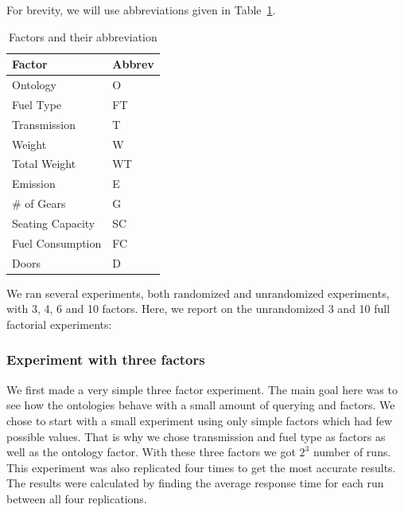 \documentclass{llncs}
\begin{document}
For brevity, we will use abbreviations given in Table~\ref{facandabbrev}.

\begin{table}
    \begin{tabular}{ | l | l |}
    \hline
    {\bf Factor} & {\bf Abbrev} \\ \hline
   Ontology & \textsf{O} \\
   Fuel Type & \textsf{FT} \\
   Transmission & \textsf{T} \\
   Weight & \textsf{W} \\
   Total Weight & \textsf{WT} \\
   Emission & \textsf{E} \\
   \# of Gears & \textsf{G} \\
   Seating Capacity & \textsf{SC} \\
   Fuel Consumption & \textsf{FC} \\
   Doors & \textsf{D} \\
\hline
    \end{tabular}
\caption{Factors and their abbreviation}\label{facandabbrev}
\end{table}


We ran several experiments, both randomized and unrandomized
experiments, with 3, 4, 6 and 10 factors. Here, we report on the
unrandomized 3 and 10 full factorial experiments:
  
\subsubsection{Experiment with three factors}
We first made a very simple three factor experiment. The main goal here was
to see how the ontologies behave with a small amount of querying and
factors. We chose to start with a small experiment using only
simple factors which had few possible values. That is why we chose
transmission and fuel type as factors as well as the ontology
factor. With these three factors we got $2^3$ number of runs. This
experiment was also replicated four times to get the most accurate
results.  The results were calculated by finding the average response
time for each run between all four replications.
\end{document}
